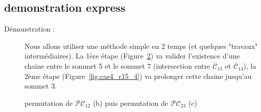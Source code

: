 \subsection{demonstration express}
\begin{description}
\item [Démonstration :] Nous allons utiliser une méthode simple en 2 temps (et quelques "travaux" intermédiaires).
La 1ère étape (Figure~\ref{fig:cas4_etap15_3}) va valider l’existence d'une chaine entre le sommet 5 et le sommet 7 (intersection entre $\overline{\mathcal{C}}_{13}$ et $\overline{\mathcal{C}}_{14}$), la 2ème étape (Figure~\ref{fig:cas4_r15_4}) va prolonger cette chaine jusqu'au sommet 3.
\end{description}
\FloatBarrier
\begin{figure}[!ht]\centering
	\begin{changemargin}{-3cm}{-5cm}
	\begin{center}
		\begin{subfigure}{0.4\textwidth}
			
			\caption{}\label{fig:cas4_etap15_2}
		\end{subfigure}
		\begin{subfigure}{0.4\textwidth}
			
			\caption{}\label{fig:cas4_etap15_3}
		\end{subfigure}
		\begin{subfigure}{0.4\textwidth}
			
			\caption{}\label{fig:cas4_etap15_4}
		\end{subfigure}
	\end{center}
	\caption{permutation de $\mathcal{PC}_{12}$ (b) puis permutation de $\mathcal{PC}_{23}$ (c)}
	\end{changemargin}
\end{figure}	
\FloatBarrier
